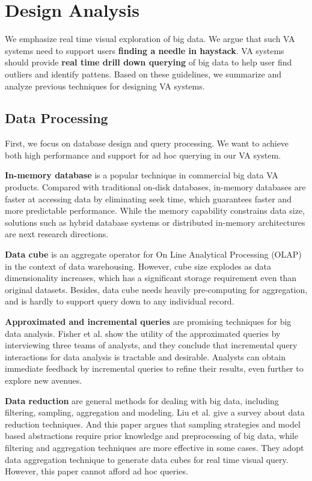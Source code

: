\documentclass[journal]{vgtc}                %
\begin{document}
{\section{Design Analysis}
We emphasize real time visual exploration of big data. We argue that such VA systems need to support users \textbf{finding a needle in haystack}. VA systems should provide \textbf{real time drill down querying} of big data to help user find outliers and identify pattens. Based on these guidelines, we summarize and analyze previous techniques for designing VA systems.

\subsection{Data Processing}
First, we focus on database design and query processing. We want to achieve both high performance and support for ad hoc querying in our VA system.  
 
\textbf{In-memory database} is a popular technique in commercial big data VA products. Compared with traditional on-disk databases, in-memory databases are faster at accessing data by eliminating seek time, which guarantees faster and more predictable performance. While the memory capability constrains  data size, solutions such as hybrid database systems or distributed in-memory architectures \cite{Kallman:2008}  are next research directions.  

\textbf{Data cube} is an aggregate operator for On Line Analytical Processing (OLAP) in the context of data warehousing. However, cube size explodes as data dimensionality increases, which has a significant storage requirement even than original datasets. Besides, data cube needs heavily pre-computing for aggregation, and is hardly to support query down to any individual record.

\textbf{Approximated and incremental queries} are promising techniques for big data analysis. Fisher et al. \cite{FisherCHI2012} show the utility of the approximated queries by interviewing three teams of analysts,  and they conclude that incremental query interactions for data analysis is tractable and desirable. Analysts can obtain immediate feedback by incremental queries to refine their results, even further to explore new avenues.  

\textbf{Data reduction} are general methods for dealing with big data, including filtering, sampling, aggregation and modeling. Liu et al. \cite{2013-immens} give a survey about data reduction techniques. And this paper argues that sampling strategies and model based abstractions require prior knowledge and preprocessing of big data, while filtering and aggregation techniques are more effective in some cases. They adopt data aggregation technique to generate data cubes for real time visual query. However, this paper cannot afford ad hoc queries.   

}
\end{document}
